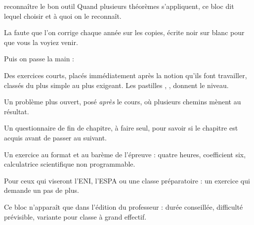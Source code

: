 \begin{methode}{reconnaître le bon outil}
Quand plusieurs théorèmes s'appliquent, ce bloc dit lequel choisir et à quoi
on le reconnaît.
\end{methode}

\begin{erreurclassique}
La faute que l'on corrige chaque année sur les copies, écrite noir sur blanc
pour que vous la voyiez venir.
\end{erreurclassique}

\noindent Puis on passe la main :

\begin{entrainement}
Des exercices courts, placés immédiatement après la notion qu'ils font
travailler, classés du plus simple au plus exigeant. Les pastilles
, ,  donnent le niveau.
\end{entrainement}

\begin{jecherche}
Un problème plus ouvert, posé \emph{après} le cours, où plusieurs chemins
mènent au résultat.
\end{jecherche}

\begin{jemeteste}
Un questionnaire de fin de chapitre, à faire seul, pour savoir si le chapitre
est acquis avant de passer au suivant.
\end{jemeteste}

\begin{commeaubac}
Un exercice au format et au barème de l'épreuve : quatre heures, coefficient
six, calculatrice scientifique non programmable.
\end{commeaubac}

\begin{concours}
Pour ceux qui viseront l'ENI, l'ESPA ou une classe préparatoire : un exercice
qui demande un pas de plus.
\end{concours}

\begin{notepourlaclasse}
Ce bloc n'apparaît que dans l'édition du professeur : durée conseillée,
difficulté prévisible, variante pour classe à grand effectif.
\end{notepourlaclasse}
